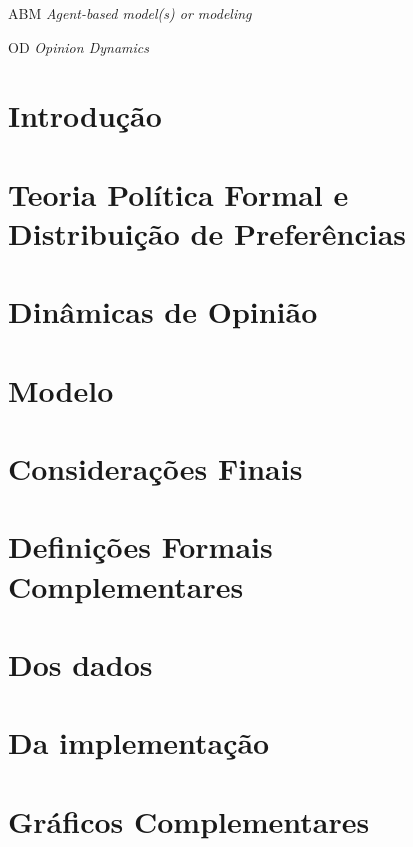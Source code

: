 \documentclass[
12pt,				%
openright,			%
oneside,			%
a4paper,			%
english, %
french, %
spanish, %
brazil, %
table,
xcdraw
]{abntex2}
\begin{document}
\begin{siglas}
\item[ABM] \textit{Agent-based model(s) or modeling}
  \item[OD] \textit{ Opinion Dynamics}
 
\end{siglas}
	\tableofcontents*
	\cleardoublepage
	\textual
	
	
	
\chapter*[Introdução]{Introdução}
      
\chapter{Teoria Política Formal e Distribuição de Preferências}


\chapter{Dinâmicas de Opinião}


 


 \chapter{Modelo}

 



\chapter*[Considerações Finais]{Considerações Finais}

%
  
    
\begin{apendicesenv}
  \partapendices

  \chapter{Definições Formais Complementares}
  
\chapter{Dos dados}



\chapter{Da implementação}




\chapter{Gráficos Complementares}



\end{apendicesenv}
\end{document}
